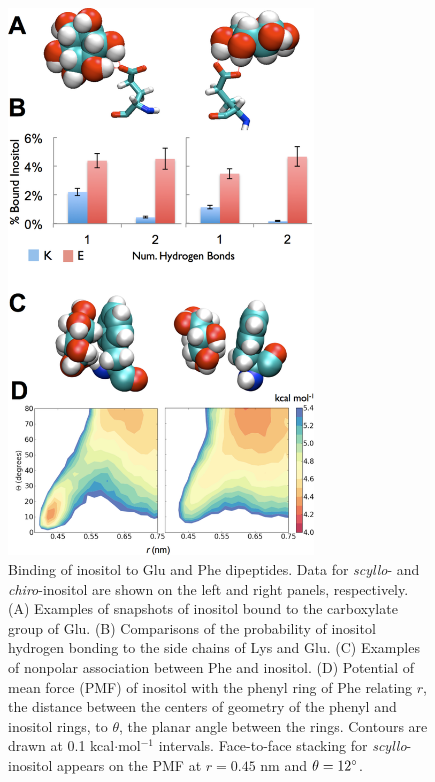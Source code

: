 \begin{figure}
\centering
\includegraphics[width=3.185in]{figures/results2/inos2_figures_monomer_residues_pmf_color.pdf}
\caption[Binding of inositol to Glu and Phe dipeptides]{Binding of inositol to Glu and Phe dipeptides. Data for \emph{scyllo}- and \emph{chiro}-inositol are shown on the left and right panels, respectively. (A) Examples of snapshots of inositol bound to the carboxylate group of Glu. (B) Comparisons of the probability of inositol hydrogen bonding to the side chains of Lys and Glu. (C) Examples of nonpolar association between Phe and inositol. (D) Potential of mean force (PMF) of inositol with the phenyl ring of Phe relating $r$, the distance between the centers of geometry of the phenyl and inositol rings, to $\theta$, the planar angle between the rings. Contours are drawn at 0.1 kcal$\cdot$mol$^{-1}$ intervals. Face-to-face stacking for \emph{scyllo}-inositol appears on the PMF at $r=0.45$ nm and $\theta=12^\circ$.}
\label{fig:monomers_glu_phe}
\end{figure}


